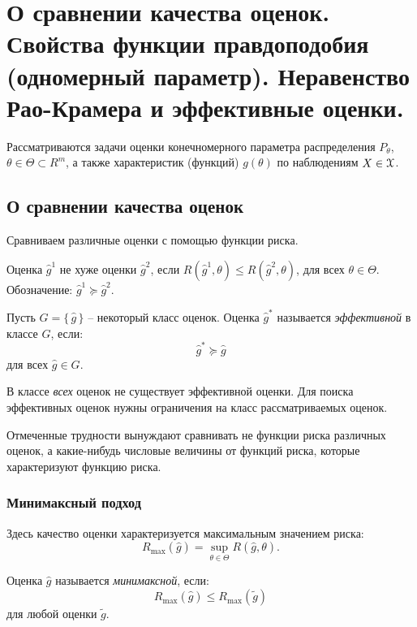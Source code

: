 \section{О сравнении качества оценок. Свойства функции правдоподобия (одномерный параметр). Неравенство Рао-Крамера и эффективные оценки.}

Рассматриваются задачи оценки конечномерного параметра распределения $P_{\theta}$, $\theta \in \Theta \subset R^m$, а также характеристик (функций) $g(\theta)$ по наблюдениям $X \in \mathcal{X}$.

\subsection{О сравнении качества оценок}
Сравниваем различные оценки с помощью функции риска. 
\begin{definition}
	Оценка $\hat{g}^{1}$ не хуже оценки $\hat{g}^{2}$, если $R(\hat{g}^{1}, \theta) \leqslant R(\hat{g}^{2}, \theta)$, для всех $\theta \in \Theta$. Обозначение: $\hat{g}^{1} \succeq \hat{g}^{2}$.
\end{definition}

\begin{definition}
	Пусть $G = \{\,\hat{g}\,\}$ -- некоторый класс оценок. Оценка $\hat{g}^{*}$ называется \textit{эффективной} в классе $G$, если:
	\[
        \hat{g}^{*} \succeq \hat{g}
	\]
	для всех $\hat{g} \in G$.
\end{definition}

В классе \textit{всех} оценок не существует эффективной оценки. Для поиска эффективных оценок нужны ограничения на класс рассматриваемых оценок.

Отмеченные трудности вынуждают сравнивать не функции риска различных оценок, а какие-нибудь числовые величины от функций риска, которые характеризуют функцию риска. 

\subsubsection{Минимаксный подход}
Здесь качество оценки характеризуется максимальным значением риска:
\[
    R_{\max}(\hat{g}) = \sup_{\theta \in \Theta} R(\hat{g}, \theta)
.\]

\begin{definition}
	Оценка $\hat{g}$ называется \textit{минимаксной}, если:
	\[
        R_{\max}(\hat{g}) \leqslant R_{\max}(\tilde{g})
	\]
	для любой оценки $\tilde{g}$.
\end{definition}


